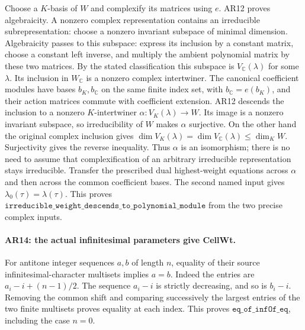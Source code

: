 Choose a $K$-basis of $W$ and complexify its matrices using $e$.
AR12 proves algebraicity. A nonzero complex representation contains
an irreducible subrepresentation: choose a nonzero invariant subspace
of minimal dimension. Algebraicity passes to this subspace: express
its inclusion by a constant matrix, choose a constant left inverse,
and multiply the ambient polynomial matrix by these two matrices.
By the stated classification this subspace is
$V_{\mathbb C}(\lambda)$ for some $\lambda$. Its inclusion in
$W_{\mathbb C}$ is a nonzero complex intertwiner. The canonical
coefficient modules have bases $b_K,b_{\mathbb C}$ on the same finite
index set, with $b_{\mathbb C}=e(b_K)$, and their action matrices
commute with coefficient extension. AR12 descends the inclusion to
a nonzero $K$-intertwiner
$\alpha:V_K(\lambda)\to W$.
Its image is a nonzero invariant subspace, so irreducibility of
$W$ makes $\alpha$ surjective. On the other hand the original
complex inclusion gives
$\dim V_K(\lambda)=\dim V_{\mathbb C}(\lambda)\le\dim_K W$.
Surjectivity gives the reverse inequality. Thus $\alpha$ is an
isomorphism; there is no need to assume that complexification of an
arbitrary irreducible representation stays irreducible.
Transfer the prescribed dual highest-weight equations across
$\alpha$ and then across the common coefficient bases. The second
named input gives $\lambda_0(\tau)=\lambda(\tau)$.
This proves $\texttt{irreducible\_weight\_descends\_to\_polynomial\_module}$
from the two precise complex inputs.

\paragraph{AR14: the actual infinitesimal parameters give CellWt.}
For antitone integer sequences $a,b$ of length $n$, equality of
their source infinitesimal-character multisets implies $a=b$.
Indeed the entries are
$a_i-i+(n-1)/2$. The sequence $a_i-i$ is strictly decreasing, and
so is $b_i-i$. Removing the common shift and comparing successively
the largest entries of the two finite multisets proves equality
at each index. This proves $\texttt{eq\_of\_infOf\_eq}$, including
the case $n=0$.

